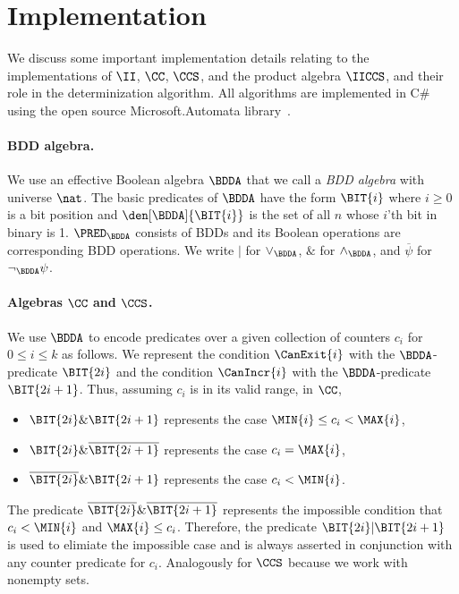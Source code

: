 \section{Implementation}\label{sec:Implementation}

We discuss some important implementation details relating to the
implementations of $\II$, $\CC$, $\CCS$, and the product algebra
$\IICCS$, and their role in the {\CA} determinization algorithm.
All algorithms are implemented in C\# using the open source Microsoft.Automata
library~\cite{automata_library}.

\paragraph{BDD algebra.}

We use an effective Boolean algebra $\BDDA$ that we call a
\emph{BDD algebra} with universe $\nat$. The basic
predicates of $\BDDA$ have the form $\BIT{i}$ where $i\geq 0$ is a bit
position and $\den[\BDDA]{\BIT{i}}$ is the set of all
$n$ whose $i$'th bit in binary is 1.  $\PRED_\BDDA$ consists of BDDs
and its Boolean operations are corresponding BDD operations.  We write
$|$ for $\vee_{\BDDA}$, $\&$ for $\wedge_{\BDDA}$, and
$\overline{\psi}$ for $\neg_{\BDDA}\psi$.

\paragraph{Algebras $\CC$ and $\CCS$.}

We use $\BDDA$ to encode predicates over a given collection of counters
$c_i$ for $0\leq i \leq k$ as follows.
We represent the condition $\CanExit{i}$ with the $\BDDA$-predicate
$\BIT{2i}$ and the condition $\CanIncr{i}$ with the $\BDDA$-predicate
$\BIT{2i+1}$. Thus, assuming $c_i$ is in its valid range, in $\CC$,
\begin{itemize}
  \item $\BIT{2i}\& \BIT{2i+1}$ represents the case $\MIN{i} \leq c_i <  \MAX{i}$,
  \item $\BIT{2i}\& \overline{\BIT{2i+1}}$ represents the case $c_i =  \MAX{i}$,
  \item $\overline{\BIT{2i}}\& \BIT{2i+1}$ represents the case $c_i <  \MIN{i}$.
\end{itemize}
The predicate $\overline{\BIT{2i}}\& \overline{\BIT{2i+1}}$ represents
the impossible condition that $c_i < \MIN{i}$ and $\MAX{i} \leq c_i$.
Therefore, the predicate $\BIT{2i}|\BIT{2i+1}$ is used to elimiate the
impossible case and is always asserted in conjunction with any counter
predicate for $c_i$.
Analogously for $\CCS$ because we work with nonempty sets.

